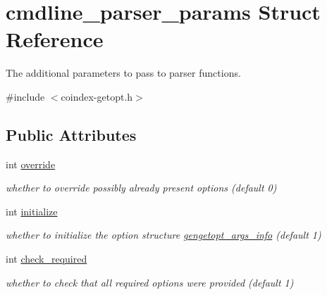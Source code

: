 \hypertarget{structcmdline__parser__params}{}\section{cmdline\+\_\+parser\+\_\+params Struct Reference}
\label{structcmdline__parser__params}


The additional parameters to pass to parser functions.  




{\ttfamily \#include $<$coindex-\/getopt.\+h$>$}

\subsection*{Public Attributes}
\begin{DoxyCompactItemize}
\item 
\mbox{\label{structcmdline__parser__params_ad3ff9d69146e69a47506782197b5675c}} 
int \hyperlink{structcmdline__parser__params_ad3ff9d69146e69a47506782197b5675c}{override}
\begin{DoxyCompactList}\small\item\em whether to override possibly already present options (default 0) \end{DoxyCompactList}\item 
\mbox{\label{structcmdline__parser__params_a97ed8a6eabd39291ae7d73f273e12c11}} 
int \hyperlink{structcmdline__parser__params_a97ed8a6eabd39291ae7d73f273e12c11}{initialize}
\begin{DoxyCompactList}\small\item\em whether to initialize the option structure \hyperlink{structgengetopt__args__info}{gengetopt\+\_\+args\+\_\+info} (default 1) \end{DoxyCompactList}\item 
\mbox{\label{structcmdline__parser__params_a44ff439d7e9e36799e59173af74829c6}} 
int \hyperlink{structcmdline__parser__params_a44ff439d7e9e36799e59173af74829c6}{check\+\_\+required}
\begin{DoxyCompactList}\small\item\em whether to check that all required options were provided (default 1) \end{DoxyCompactList}\item 

\end{DoxyCompactItemize}
